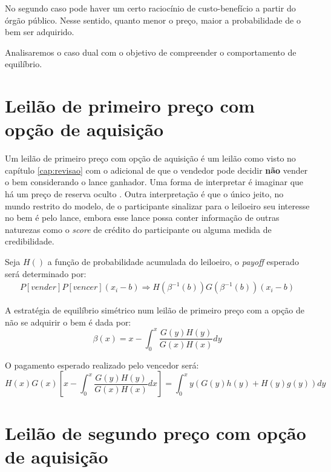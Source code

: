 No segundo caso pode haver um certo raciocínio de custo-benefício a partir do órgão público. Nesse sentido, quanto menor o preço, maior a probabilidade de o bem ser adquirido.

Analisaremos o caso dual com o objetivo de compreender o comportamento de equilíbrio.

\section{Leilão de primeiro preço com opção de aquisição}

Um leilão de primeiro preço com opção de aquisição é um leilão como visto no capítulo \ref{cap:revisao} com o adicional de que o vendedor pode decidir \textbf{não} vender o bem considerando o lance ganhador. Uma forma de interpretar é imaginar que há um preço de reserva oculto \citet{Bugarin2022}. Outra interpretação é que o único jeito, no mundo restrito do modelo, de o participante sinalizar para o leiloeiro seu interesse no bem é pelo lance, embora esse lance possa conter informação de outras naturezas como o \emph{score} de crédito do participante ou alguma medida de credibilidade.

Seja $H()$ a função de probabilidade acumulada do leiloeiro, o \emph{payoff} esperado será determinado por:
\begin{align*}
	P[vender]P[vencer](x_i - b) \Rightarrow H(\beta^{-1}(b))G(\beta^{-1}(b))(x_i - b)
\end{align*}

\begin{lema}
	\label{lema:nash-primeiro-preco-opcao}
	A estratégia de equilíbrio simétrico num leilão de primeiro preço com a opção de não se adquirir o bem é dada por:
	\begin{equation}
		\beta(x) = x - \int_0^x \frac{G(y)H(y)}{G(x)H(x)}dy
	\end{equation}
\end{lema}

O pagamento esperado realizado pelo vencedor será:
\begin{equation}
	H(x)G(x) \left[ x - \int_0^x \frac{G(y)H(y)}{G(x)H(x)}dx \right] = \int_0^x y(G(y)h(y)+H(y)g(y)) dy
\end{equation}

\section{Leilão de segundo preço com opção de aquisição}

